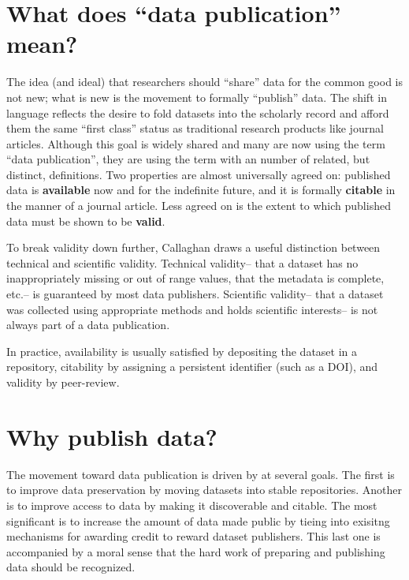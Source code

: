 \documentclass[10pt,a4paper,twocolumn]{article}
\begin{document}
\section*{What does ``data publication'' mean?}\label{what-does-data-publication-mean}

The idea (and ideal) that researchers should ``share'' data for the common good is not new; what is new is the movement to formally ``publish'' data.
The shift in language reflects the desire to fold datasets into the scholarly record and afford them the same ``first class'' status as traditional research products like journal articles.
Although this goal is widely shared and many are now using the term ``data publication'', they are using the term with an number of related, but distinct, definitions.
Two properties are almost universally agreed on: published data is \textbf{available} now and for the indefinite future, and it is formally \textbf{citable} in the manner of a journal article. 
Less agreed on is the extent to which published data must be shown to be \textbf{valid}.

To break validity down further, Callaghan\cite{callaghan_making_2012} draws a useful distinction between technical and scientific validity.
Technical validity– that a dataset has no inappropriately missing or out of range values, that the metadata is complete, etc.– is guaranteed by most data publishers. Scientific validity– that a dataset was collected using appropriate methods and holds scientific interests– is not always part of a data publication.

In practice, availability is usually satisfied by depositing the dataset in a repository, citability by assigning a persistent identifier (such as a DOI), and validity by peer-review.

\section*{Why publish data?}\label{why-publish-data}

The movement toward data publication is driven by at several goals.
The first is to improve data preservation by moving datasets into stable repositories.
Another is to improve access to data by making it discoverable and citable.
The most significant is to increase the amount of data made public by tieing into exisitng mechanisms for awarding credit to reward dataset publishers.
This last one is accompanied by a moral sense that the hard work of preparing and publishing data should be recognized.
\end{document}
